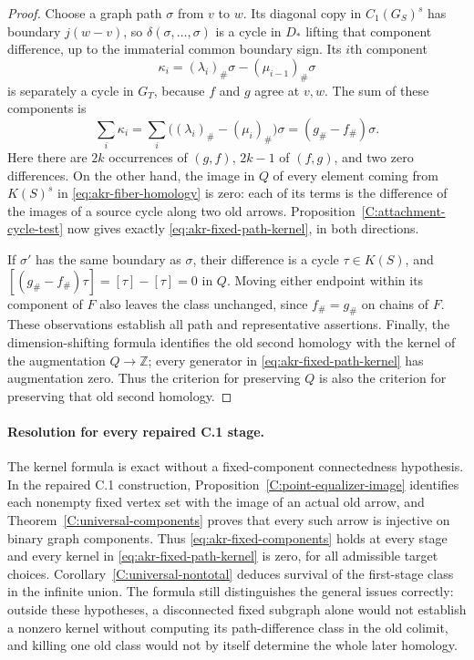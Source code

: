 \begin{proof}
Choose a graph path $\sigma$ from $v$ to $w$. Its diagonal copy in
$C_1(G_S)^s$ has boundary $j(w-v)$, so
$\delta(\sigma,\ldots,\sigma)$ is a cycle in $D_*$ lifting that
component difference, up to the immaterial common boundary sign.
Its $i$th component
\[
 \kappa_i=(\lambda_i)_\#\sigma-(\mu_{i-1})_\#\sigma
\]
is separately a cycle in $G_T$, because $f$ and $g$ agree at $v,w$.
The sum of these components is
\[
 \sum_i\kappa_i
 =\sum_i\bigl((\lambda_i)_\#-(\mu_i)_\#\bigr)\sigma
 =(g_\#-f_\#)\sigma.
\]
Here there are $2k$ occurrences of $(g,f)$, $2k-1$ of $(f,g)$,
and two zero differences. On the other hand, the image in $Q$ of
every element coming from $K(S)^s$ in
\eqref{eq:akr-fiber-homology} is zero: each of its terms is the
difference of the images of a source cycle along two old arrows.
Proposition~\ref{C:attachment-cycle-test} now gives exactly
\eqref{eq:akr-fixed-path-kernel}, in both directions.

If $\sigma'$ has the same boundary as $\sigma$, their difference is
a cycle $\tau\in K(S)$, and
$[(g_\#-f_\#)\tau]=[\tau]-[\tau]=0$ in $Q$. Moving either endpoint
within its component of $F$ also leaves the class unchanged, since
$f_\#=g_\#$ on chains of $F$. These observations establish all path
and representative assertions. Finally, the dimension-shifting
formula identifies the old second homology with the kernel of the
augmentation $Q\to\mathbb Z$; every generator in
\eqref{eq:akr-fixed-path-kernel} has augmentation zero. Thus the
criterion for preserving $Q$ is also the criterion for preserving
that old second homology.
\end{proof}

\paragraph{Resolution for every repaired C.1 stage.}
The kernel formula is exact without a fixed-component
connectedness hypothesis. In the repaired C.1 construction,
Proposition~\ref{C:point-equalizer-image} identifies each nonempty
fixed vertex set with the image of an actual old arrow, and
Theorem~\ref{C:universal-components} proves that every such arrow
is injective on binary graph components. Thus
\eqref{eq:akr-fixed-components} holds at every stage and every
kernel in \eqref{eq:akr-fixed-path-kernel} is zero, for all
admissible target choices. Corollary~\ref{C:universal-nontotal}
deduces survival of the first-stage class in the infinite union.
The formula still distinguishes the general issues correctly:
outside these hypotheses, a disconnected fixed subgraph alone
would not establish a nonzero kernel without computing its
path-difference class in the old colimit, and killing one old
class would not by itself determine the whole later homology.
